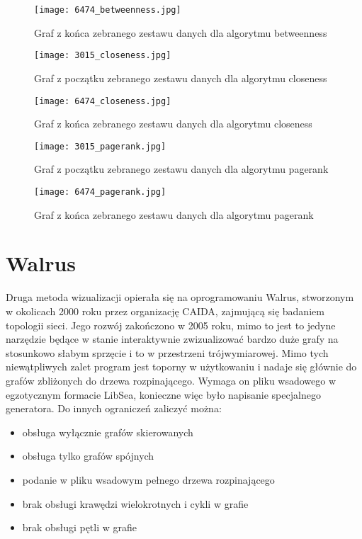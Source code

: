 \FloatBarrier\FloatBarrier
\begin{figure}[h]
	\centering
	\texttt{[image: 6474\_betweenness.jpg]}
	\caption{Graf z końca zebranego zestawu danych dla algorytmu betweenness}
\end{figure}
\FloatBarrier\FloatBarrier

\FloatBarrier\FloatBarrier
\begin{figure}[h]
	\centering
	\texttt{[image: 3015\_closeness.jpg]}
	\caption{Graf z początku zebranego zestawu danych dla algorytmu closeness}
\end{figure}
\FloatBarrier\FloatBarrier

\FloatBarrier\FloatBarrier
\begin{figure}[h]
	\centering
	\texttt{[image: 6474\_closeness.jpg]}
	\caption{Graf z końca zebranego zestawu danych dla algorytmu closeness}
\end{figure}
\FloatBarrier\FloatBarrier

\FloatBarrier\FloatBarrier
\begin{figure}[h]
	\centering
	\texttt{[image: 3015\_pagerank.jpg]}
	\caption{Graf z początku zebranego zestawu danych dla algorytmu pagerank}
\end{figure}
\FloatBarrier\FloatBarrier

\FloatBarrier\FloatBarrier
\begin{figure}[h]
	\centering
	\texttt{[image: 6474\_pagerank.jpg]}
	\caption{Graf z końca zebranego zestawu danych dla algorytmu pagerank}
\end{figure}
\FloatBarrier\FloatBarrier

\section{Walrus}

Druga metoda wizualizacji opierała się na oprogramowaniu Walrus, stworzonym w okolicach 2000 roku przez organizację CAIDA, zajmującą się badaniem topologii sieci. Jego rozwój zakończono w 2005 roku, mimo to jest to jedyne narzędzie będące w stanie interaktywnie zwizualizować bardzo duże grafy na stosunkowo słabym sprzęcie i to w przestrzeni trójwymiarowej. Mimo tych niewątpliwych zalet program jest toporny w użytkowaniu i nadaje się głównie do grafów zbliżonych do drzewa rozpinającego. Wymaga on pliku wsadowego w egzotycznym formacie LibSea, konieczne więc było napisanie specjalnego generatora. Do innych ograniczeń zaliczyć można: 
\begin{itemize}
\item obsługa wyłącznie grafów skierowanych
\item obsługa tylko grafów spójnych
\item podanie w pliku wsadowym pełnego drzewa rozpinającego
\item brak obsługi krawędzi wielokrotnych i cykli w grafie
\item brak obsługi pętli w grafie
\end{itemize}

